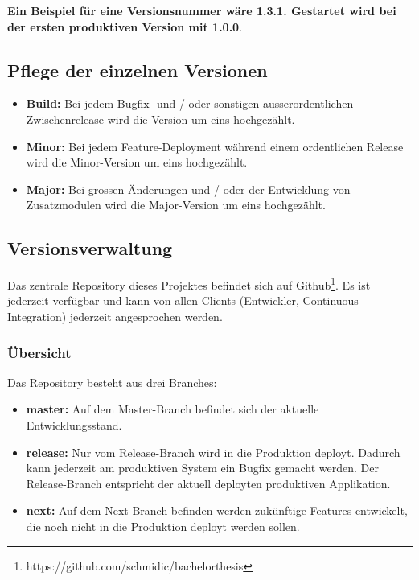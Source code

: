 \textbf{Ein Beispiel für eine Versionsnummer wäre 1.3.1. Gestartet wird bei der ersten produktiven Version mit 1.0.0}. 
\subsection{Pflege der einzelnen Versionen}
\begin{itemize}
\item \textbf{Build:} Bei jedem Bugfix- und / oder sonstigen ausserordentlichen Zwischenrelease wird die Version um eins hochgezählt.
\item \textbf{Minor:} Bei jedem Feature-Deployment während einem ordentlichen Release wird die Minor-Version um eins hochgezählt.
\item \textbf{Major:} Bei grossen Änderungen und / oder der Entwicklung von Zusatzmodulen wird die Major-Version um eins hochgezählt.

\end{itemize}


\subsection{Versionsverwaltung}
Das zentrale Repository dieses Projektes befindet sich auf Github\footnote{https://github.com/schmidic/bachelorthesis}. Es ist jederzeit verfügbar und kann von allen Clients (Entwickler, Continuous Integration) jederzeit angesprochen werden.
\subsubsection{Übersicht}
Das Repository besteht aus drei Branches:
\begin{itemize}
\item \textbf{master:} Auf dem Master-Branch befindet sich der aktuelle Entwicklungsstand. 
\item \textbf{release:} Nur vom Release-Branch wird in die Produktion deployt. Dadurch kann jederzeit am produktiven System ein Bugfix gemacht werden. Der Release-Branch entspricht der aktuell deployten produktiven Applikation.
\item \textbf{next:} Auf dem Next-Branch befinden werden zukünftige Features entwickelt, die noch nicht in die Produktion deployt werden sollen.
\end{itemize}

